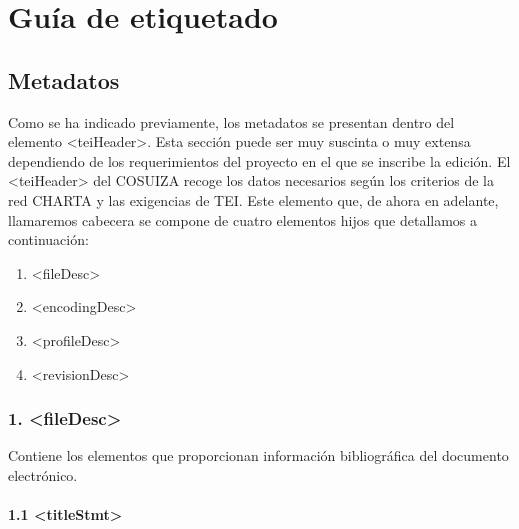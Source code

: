 \documentclass[
]{book}
\providecommand{\tightlist}{%
  \setlength{\itemsep}{0pt}\setlength{\parskip}{0pt}}
\begin{document}
\hypertarget{guuxeda-de-etiquetado}{%
\section*{Guía de etiquetado}\label{guuxeda-de-etiquetado}}

\hypertarget{metadatos}{%
\subsection*{Metadatos}\label{metadatos}}

Como se ha indicado previamente, los metadatos se presentan dentro del elemento { \textless teiHeader\textgreater{}}. Esta sección puede ser muy suscinta o muy extensa dependiendo de los requerimientos del proyecto en el que se inscribe la edición. El {\textless teiHeader\textgreater{}} del COSUIZA recoge los datos necesarios según los criterios de la red CHARTA y las exigencias de TEI. Este elemento que, de ahora en adelante, llamaremos cabecera se compone de cuatro elementos hijos que detallamos a continuación:

\begin{enumerate}
\def\labelenumi{\arabic{enumi}.}
\tightlist
\item
  { \textless fileDesc\textgreater{} }
\item
  { \textless encodingDesc\textgreater{} }
\item
  { \textless profileDesc\textgreater{} }
\item
  { \textless revisionDesc\textgreater{} }
\end{enumerate}

\hypertarget{filedesc}{%
\subsubsection*{\texorpdfstring{1. { \textless fileDesc\textgreater{} }}{1.  \textless fileDesc\textgreater{} }}\label{filedesc}}

Contiene los elementos que proporcionan información bibliográfica del documento electrónico.

\hypertarget{titlestmt}{%
\paragraph*{\texorpdfstring{1.1 { \textless titleStmt\textgreater{} }}{1.1  \textless titleStmt\textgreater{} }}\label{titlestmt}}
\end{document}
